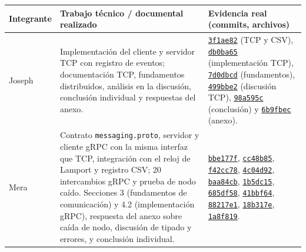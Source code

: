 \begin{table}[htbp]
\centering
\small
\begin{tabularx}{\linewidth}{@{}lXX@{}}
\toprule
\textbf{Integrante} & \textbf{Trabajo técnico / documental realizado} & \textbf{Evidencia real (commits, archivos)} \\
\midrule
Joseph & Implementación del cliente y servidor TCP con registro de eventos; documentación TCP, fundamentos distribuidos, análisis en la discusión, conclusión individual y respuestas del anexo. & \href{https://github.com/Yukisan-uwo/GA-SUM-02-PE-U1-Practica-Experimental-Unidad-1/commit/3f1ae82}{\texttt{3f1ae82}} (TCP y CSV), \href{https://github.com/Yukisan-uwo/GA-SUM-02-PE-U1-Practica-Experimental-Unidad-1/commit/db0ba65}{\texttt{db0ba65}} (implementación TCP), \href{https://github.com/Yukisan-uwo/GA-SUM-02-PE-U1-Practica-Experimental-Unidad-1/commit/7d0dbcd}{\texttt{7d0dbcd}} (fundamentos), \href{https://github.com/Yukisan-uwo/GA-SUM-02-PE-U1-Practica-Experimental-Unidad-1/commit/499bbe2}{\texttt{499bbe2}} (discusión TCP), \href{https://github.com/Yukisan-uwo/GA-SUM-02-PE-U1-Practica-Experimental-Unidad-1/commit/98a595c}{\texttt{98a595c}} (conclusión) y \href{https://github.com/Yukisan-uwo/GA-SUM-02-PE-U1-Practica-Experimental-Unidad-1/commit/6b9fbec}{\texttt{6b9fbec}} (anexo). \\
Mera & Contrato \texttt{messaging.proto}, servidor y cliente gRPC con la misma interfaz que TCP, integración con el reloj de Lamport y registro CSV; 20 intercambios gRPC y prueba de nodo caído. Secciones 3 (fundamentos de comunicación) y 4.2 (implementación gRPC), respuesta del anexo sobre caída de nodo, discusión de tipado y errores, y conclusión individual. & \href{https://github.com/Yukisan-uwo/GA-SUM-02-PE-U1-Practica-Experimental-Unidad-1/commit/bbe177f}{\texttt{bbe177f}}, \href{https://github.com/Yukisan-uwo/GA-SUM-02-PE-U1-Practica-Experimental-Unidad-1/commit/cc48b85}{\texttt{cc48b85}}, \href{https://github.com/Yukisan-uwo/GA-SUM-02-PE-U1-Practica-Experimental-Unidad-1/commit/f42cc78}{\texttt{f42cc78}}, \href{https://github.com/Yukisan-uwo/GA-SUM-02-PE-U1-Practica-Experimental-Unidad-1/commit/4c04d92}{\texttt{4c04d92}}, \href{https://github.com/Yukisan-uwo/GA-SUM-02-PE-U1-Practica-Experimental-Unidad-1/commit/baa84cb}{\texttt{baa84cb}}, \href{https://github.com/Yukisan-uwo/GA-SUM-02-PE-U1-Practica-Experimental-Unidad-1/commit/1b5dc15}{\texttt{1b5dc15}}, \href{https://github.com/Yukisan-uwo/GA-SUM-02-PE-U1-Practica-Experimental-Unidad-1/commit/685df58}{\texttt{685df58}}, \href{https://github.com/Yukisan-uwo/GA-SUM-02-PE-U1-Practica-Experimental-Unidad-1/commit/41bbf64}{\texttt{41bbf64}}, \href{https://github.com/Yukisan-uwo/GA-SUM-02-PE-U1-Practica-Experimental-Unidad-1/commit/88217e1}{\texttt{88217e1}}, \href{https://github.com/Yukisan-uwo/GA-SUM-02-PE-U1-Practica-Experimental-Unidad-1/commit/18b317e}{\texttt{18b317e}}, \href{https://github.com/Yukisan-uwo/GA-SUM-02-PE-U1-Practica-Experimental-Unidad-1/commit/1a8f819}{\texttt{1a8f819}}. \\




\end{tabularx}
\end{table}

